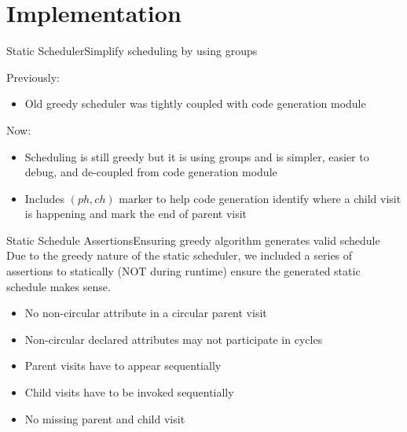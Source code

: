 \section{Implementation}


\begin{frame}{Static Scheduler}{Simplify scheduling by using groups}

Previously:
\begin{itemize}
    \item Old greedy scheduler was \alert{tightly coupled with code generation} module
\end{itemize}
    
Now:
\begin{itemize}
    \item Scheduling is still greedy but it is using groups and is simpler, easier to debug, and \alert{de-coupled from code generation} module
    \item Includes $(\mathit{ph}, \mathit{ch})$ marker to help code generation identify where a \alert{child visit} is happening and mark the \alert{end of parent visit}
\end{itemize}

\end{frame}






\begin{frame}{Static Schedule Assertions}{Ensuring greedy algorithm generates valid schedule}
    Due to the \alert{greedy nature of the static scheduler}, we included a series of \alert{assertions} to \alert{statically} (NOT during runtime) ensure the generated static schedule makes sense.

\newlinevspace
    
    \begin{itemize}
        \item No non-circular attribute in a circular parent visit
        \item Non-circular declared attributes may not participate in cycles
        \item Parent visits have to appear sequentially
        \item Child visits have to be invoked sequentially
        \item No missing parent and child visit
    \end{itemize}
\end{frame}

